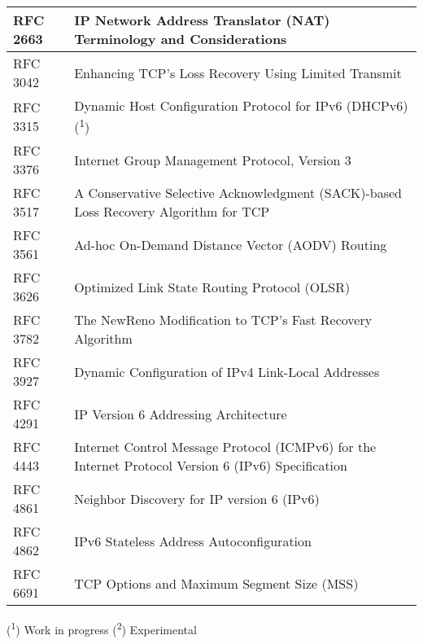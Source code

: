 \begin{longtable}{ | l | p{15cm} | }
RFC 2663 &
IP Network Address Translator (NAT) Terminology and Considerations \\ \hline

RFC 3042 &
Enhancing TCP's Loss Recovery Using Limited Transmit \\ \hline

RFC 3315 &
Dynamic Host Configuration Protocol for IPv6 (DHCPv6) (\textsuperscript{1}) \\ \hline

RFC 3376 &
Internet Group Management Protocol, Version 3 \\ \hline

RFC 3517 &
A Conservative Selective Acknowledgment (SACK)-based Loss Recovery Algorithm for TCP \\ \hline

RFC 3561 &
Ad-hoc On-Demand Distance Vector (AODV) Routing \\ \hline

RFC 3626 &
Optimized Link State Routing Protocol (OLSR) \\ \hline

RFC 3782 &
The NewReno Modification to TCP's Fast Recovery Algorithm \\ \hline

RFC 3927 &
Dynamic Configuration of IPv4 Link-Local Addresses \\ \hline

RFC 4291 &
IP Version 6 Addressing Architecture \\ \hline

RFC 4443 &
Internet Control Message Protocol (ICMPv6) for the Internet Protocol Version 6 (IPv6) Specification \\ \hline

RFC 4861 &
Neighbor Discovery for IP version 6 (IPv6) \\ \hline

RFC 4862 &
IPv6 Stateless Address Autoconfiguration \\ \hline

RFC 6691 &
TCP Options and Maximum Segment Size (MSS) \\ \hline

\end{longtable}

(\textsuperscript{1}) Work in progress
(\textsuperscript{2}) Experimental
